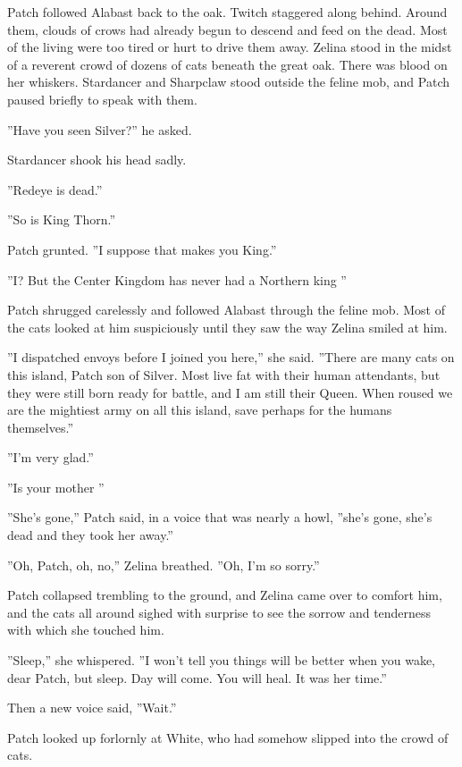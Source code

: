 \documentclass[12pt]{book}
\begin{document}
 Patch followed Alabast back to the oak. Twitch staggered along behind. Around them, clouds of crows had already begun to descend and feed on the dead. Most of the living were too tired or hurt to drive them away. Zelina stood in the midst of a reverent crowd of dozens of cats beneath the great oak. There was blood on her whiskers. Stardancer and Sharpclaw stood outside the feline mob, and Patch paused briefly to speak with them.\par
 ''Have you seen Silver?'' he asked.\par
 Stardancer shook his head sadly.\par
 ''Redeye is dead.''\par
 ''So is King Thorn.''\par
 Patch grunted. ''I suppose that makes you King.''\par
 ''I? But %
 the Center Kingdom has never had a Northern king %
''\par
 Patch shrugged carelessly and followed Alabast through the feline mob. Most of the cats looked at him suspiciously until they saw the way Zelina smiled at him.\par
 ''I dispatched envoys before I joined you here,'' she said. ''There are many cats on this island, Patch son of Silver. Most live fat with their human attendants, but they were still born ready for battle, and I am still their Queen. When roused we are the mightiest army on all this island, save perhaps for the humans themselves.''\par
 ''I'm very glad.''\par
 ''Is your mother %
''\par
 ''She's gone,'' Patch said, in a voice that was nearly a howl, ''she's gone, she's dead and they took her away.''\par
 ''Oh, Patch, oh, no,'' Zelina breathed. ''Oh, I'm so sorry.''\par
 Patch collapsed trembling to the ground, and Zelina came over to comfort him, and the cats all around sighed with surprise to see the sorrow and tenderness with which she touched him.\par
 ''Sleep,'' she whispered. ''I won't tell you things will be better when you wake, dear Patch, but sleep. Day will come. You will heal. It was her time.''\par
 Then a new voice said, ''Wait.''\par
 Patch looked up forlornly at White, who had somehow slipped into the crowd of cats. \par
\end{document}
